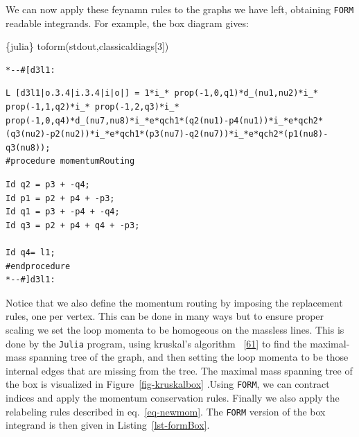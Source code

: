 \documentclass[
  11pt,
  a4paper,
  DIV=11,
  numbers=noendperiod,
  twoside]{scrreprt}
\newenvironment{Shaded}{\begin{snugshade}}{\end{snugshade}}
\newcommand{\DecValTok}[1]{\textcolor[rgb]{0.68,0.00,0.00}{#1}}
\newcommand{\InformationTok}[1]{\textcolor[rgb]{0.37,0.37,0.37}{#1}}
\newcommand{\NormalTok}[1]{\textcolor[rgb]{0.00,0.23,0.31}{#1}}
\DeclareRobustCommand{\[}{\begin{equation}}
\DeclareRobustCommand{\]}{\end{equation}}
\begin{document}
We can now apply these feynamn rules to the graphs we have left,
obtaining \texttt{FORM} readable integrands. For example, the box
diagram gives:

\begin{Shaded}
\begin{Highlighting}[]
\InformationTok{\textasciigrave{}\textasciigrave{}\textasciigrave{}\{julia\}}
\NormalTok{toform(stdout,classicaldiags[}\DecValTok{3}\NormalTok{])}
\InformationTok{\textasciigrave{}\textasciigrave{}\textasciigrave{}}
\end{Highlighting}
\end{Shaded}

\begin{verbatim}
*--#[d3l1:
\end{verbatim}

\begin{verbatim}
L [d3l1|o.3.4|i.3.4|i|o|] = 1*i_* prop(-1,0,q1)*d_(nu1,nu2)*i_* prop(-1,1,q2)*i_* prop(-1,2,q3)*i_* prop(-1,0,q4)*d_(nu7,nu8)*i_*e*qch1*(q2(nu1)-p4(nu1))*i_*e*qch2*(q3(nu2)-p2(nu2))*i_*e*qch1*(p3(nu7)-q2(nu7))*i_*e*qch2*(p1(nu8)-q3(nu8));
#procedure momentumRouting
\end{verbatim}

\begin{verbatim}
Id q2 = p3 + -q4;
Id p1 = p2 + p4 + -p3;
Id q1 = p3 + -p4 + -q4;
Id q3 = p2 + p4 + q4 + -p3;

Id q4= l1;
#endprocedure
*--#]d3l1:
\end{verbatim}

Notice that we also define the momentum routing by imposing the
replacement rules, one per vertex. This can be done in many ways but to
ensure proper scaling we set the loop momenta to be homogeous on the
massless lines. This is done by the \texttt{Julia} program, using
kruskal's algorithm ~{[}\protect\hyperlink{ref-Kruskal:1956}{61}{]} to
find the maximal-mass spanning tree of the graph, and then setting the
loop momenta to be those internal edges that are missing from the tree.
The maximal mass spanning tree of the box is visualized in
Figure~\ref{fig-kruskalbox} .Using \texttt{FORM}, we can contract
indices and apply the momentum conservation rules. Finally we also apply
the relabeling rules described in eq.~\ref{eq-newmom}. The \texttt{FORM}
version of the box integrand is then given in Listing~\ref{lst-formBox}.
\end{document}
